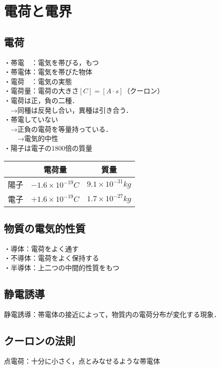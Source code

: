 \section{電荷と電界}
\subsection{電荷}
・帯電　：電気を帯びる，もつ\\
・帯電体：電気を帯びた物体\\
・電荷　：電気の実態\\
・電荷量：電荷の大きさ$[C]=[A \cdot s]$（クーロン）\\
・電荷は正，負の二種．\\
　→同種は反発し合い，異種は引き合う．\\
・帯電していない\\
　→正負の電荷を等量持っている．\\
　　→電気的中性\\
・陽子は電子の1800倍の質量\\
\begin{table}[htb]
  \begin{center}
    \begin{tabular}{|l|c|c|} \hline
      & 電荷量 & 質量 \\ \hline
      陽子 & $-1.6 \times 10^{-19}C$ & $9.1 \times 10^{-31}kg$\\
      電子 & $+1.6 \times 10^{-19}C$ & $1.7 \times 10^{-27}kg$\\ \hline
    \end{tabular}
  \end{center}
\end{table}

\subsection{物質の電気的性質}
・導体：電荷をよく通す\\
・不導体：電荷をよく保持する\\
・半導体：上二つの中間的性質をもつ\\

\subsection{静電誘導}
静電誘導：帯電体の接近によって，物質内の電荷分布が変化する現象．

\subsection{クーロンの法則}
点電荷：十分に小さく，点とみなせるような帯電体\\


